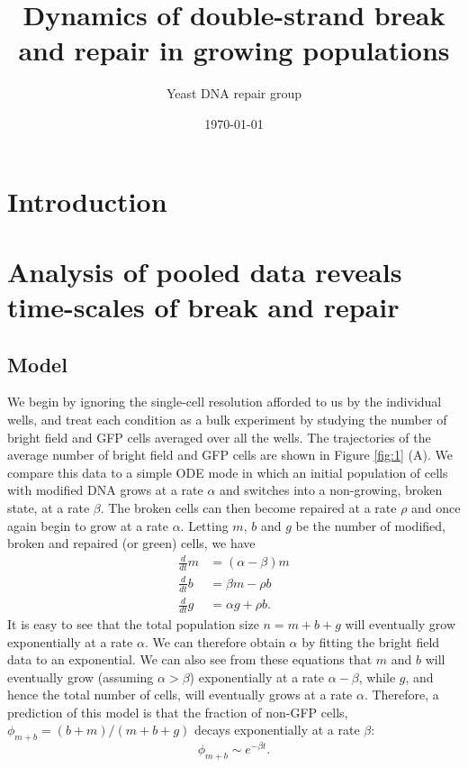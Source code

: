 \documentclass{article}
\author[1]{Yeast DNA repair group}
\title{Dynamics of double-strand break and repair in growing populations}
\date{\today}
\makeatletter
\renewcommand{\maketitle}{\bgroup\setlength{\parindent}{0pt}
\begin{flushleft}
  \textbf{\LARGE \@title}

  \@author
\end{flushleft}\egroup
}
\makeatother
\begin{document}
\maketitle
\tableofcontents

\section{Introduction}

\section{Analysis of pooled data reveals time-scales of break and repair}

\subsection{Model}
We begin by ignoring the single-cell resolution afforded to us by the individual wells, and treat each condition as a bulk experiment by studying the number of bright field and GFP cells averaged over all the wells. The trajectories of the average number of bright field and GFP cells are shown in Figure \ref{fig:1} (A). We compare this data to a simple ODE mode in which an initial population of cells with modified DNA grows at a rate $\alpha$ and switches into a non-growing, broken state, at a rate $\beta$. The broken cells can then become repaired at a rate $\rho$ and once again begin to grow at a rate $\alpha$. Letting $m$, $b$ and $g$ be the number of modified, broken and repaired (or green) cells, we have
\begin{align}\label{mbg_ode}
\frac{d}{dt}m &= (\alpha - \beta) m\\
\frac{d}{dt}b &= \beta m - \rho b\\
\frac{d}{dt}g &= \alpha g + \rho b.
\end{align}
It is easy to see that the total population size $n = m+b+g$ will eventually grow exponentially at a rate $\alpha$. We can therefore obtain $\alpha$ by fitting the bright field data to an exponential. We can also see from these equations that $m$ and $b$ will eventually grow (assuming $\alpha> \beta$) exponentially at a rate $\alpha-\beta$, while $g$, and hence the total number of cells, will eventually grows at a rate $\alpha$. 
Therefore, a prediction of this model is that the fraction of  non-GFP cells, $\phi_{m+b} = (b+m)/(m+b+g)$  decays exponentially at a rate $\beta$:
\begin{equation}
\phi_{m+b} \sim e^{-\beta t}. 
\end{equation}
\end{document}
